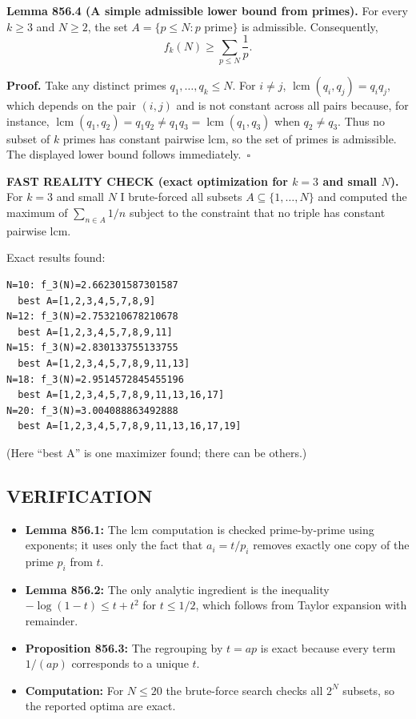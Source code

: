 \medskip
\textbf{Lemma 856.4 (A simple admissible lower bound from primes).}
For every $k\ge 3$ and $N\ge 2$, the set $A=\{p\le N: p\text{ prime}\}$ is admissible. Consequently,
\[
  f_k(N) \ge \sum_{p\le N}\frac{1}{p}.
\]

\textbf{Proof.}
Take any distinct primes $q_1,\dots,q_k\le N$. For $i\ne j$, $\operatorname{lcm}(q_i,q_j)=q_i q_j$, which depends on the pair $(i,j)$ and is not constant across all pairs because, for instance, $\operatorname{lcm}(q_1,q_2)=q_1q_2\ne q_1q_3=\operatorname{lcm}(q_1,q_3)$ when $q_2\ne q_3$.
Thus no subset of $k$ primes has constant pairwise lcm, so the set of primes is admissible. The displayed lower bound follows immediately.\ $\square$

\medskip
\textbf{FAST REALITY CHECK (exact optimization for $k=3$ and small $N$).}
For $k=3$ and small $N$ I brute-forced all subsets $A\subseteq\{1,\dots,N\}$ and computed the maximum of $\sum_{n\in A}1/n$ subject to the constraint that no triple has constant pairwise lcm.

Exact results found:
\begin{verbatim}
N=10: f_3(N)=2.662301587301587
  best A=[1,2,3,4,5,7,8,9]
N=12: f_3(N)=2.753210678210678
  best A=[1,2,3,4,5,7,8,9,11]
N=15: f_3(N)=2.830133755133755
  best A=[1,2,3,4,5,7,8,9,11,13]
N=18: f_3(N)=2.9514572845455196
  best A=[1,2,3,4,5,7,8,9,11,13,16,17]
N=20: f_3(N)=3.004088863492888
  best A=[1,2,3,4,5,7,8,9,11,13,16,17,19]
\end{verbatim}
(Here ``best A'' is one maximizer found; there can be others.)

\subsection*{VERIFICATION}
\begin{itemize}
\item \textbf{Lemma 856.1:} The lcm computation is checked prime-by-prime using exponents; it uses only the fact that $a_i=t/p_i$ removes exactly one copy of the prime $p_i$ from $t$.
\item \textbf{Lemma 856.2:} The only analytic ingredient is the inequality $-\log(1-t)\le t+t^2$ for $t\le 1/2$, which follows from Taylor expansion with remainder.
\item \textbf{Proposition 856.3:} The regrouping by $t=ap$ is exact because every term $1/(ap)$ corresponds to a unique $t$.
\item \textbf{Computation:} For $N\le 20$ the brute-force search checks all $2^N$ subsets, so the reported optima are exact.
\end{itemize}

